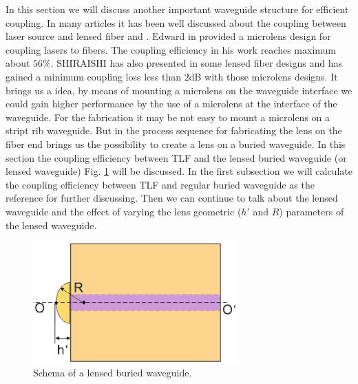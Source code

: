 In this section we will discuss another important waveguide structure for efficient coupling. In many articles it has been well discussed about the coupling between laser source and lensed fiber\cite{microlensese_to_fiber_coupling} and \cite{integrated_coupling _between_LD_SMF}.  Edward in \cite{microlensese_to_fiber_coupling} provided a microlens design for coupling lasers to fibers. The coupling efficiency in his work reaches maximum about $56\%$. SHIRAISHI has also presented in \cite{integrated_coupling _between_LD_SMF} some lensed fiber designs and has gained a minimum coupling loss less than $2$dB with those microlens designs. It brings us a idea, by means of mounting a microlens on the waveguide interface we could gain higher performance by the use of a microlens at the interface of the waveguide. For the fabrication it may be not easy to mount a microlens on a stript rib waveguide. But in \cite{lens_end_manufacture} the process sequence for fabricating the lens on the fiber end brings us the possibility to create a lens on a buried waveguide. In this section the coupling efficiency between TLF and the lensed buried waveguide (or lensed waveguide) Fig. \ref{fig:lensed_waveguide} will be discussed.
In the first subsection we will calculate the coupling efficiency between TLF and regular buried waveguide as the reference for further discussing. Then we can continue to talk about the lensed waveguide and the effect of varying the lens geometric ($h'$ and $R$) parameters of the lensed waveguide. 
\begin{figure}[!ht]
\centering
\includegraphics[width=0.7\textwidth]{bilder/lensed_waveguide}
\caption{Schema of a lensed buried waveguide.}
\label{fig:lensed_waveguide}
\end{figure}

